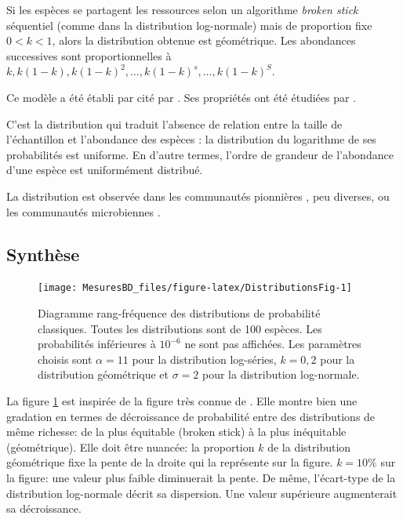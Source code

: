 \documentclass[
  11pt,
  american,
  a4paper,
  extrafontsizes,onecolumn,openright
  ]{memoir}
\begin{document}
Si les espèces se partagent les ressources selon un algorithme \emph{broken stick} séquentiel (comme dans la distribution log-normale) mais de proportion fixe \(0<k<1\), alors la distribution obtenue est géométrique.
Les abondances successives sont proportionnelles à \(k, k(1-k), k(1-k)^2, \dots, k(1-k)^s, \dots, k(1-k)^S\).

Ce modèle a été établi par \textcite{Motomura1932} cité par \textcite{May1975}.
Ses propriétés ont été étudiées par \textcite{Whittaker1972}.

C'est la distribution qui traduit l'absence de relation entre la taille de l'échantillon et l'abondance des espèces \autocite{Pueyo2007}: la distribution du logarithme de ses probabilités est uniforme.
En d'autre termes, l'ordre de grandeur de l'abondance d'une espèce est uniformément distribué.

La distribution est observée dans les communautés pionnières \autocite{Bazzaz1975}, peu diverses, ou les communautés microbiennes \autocite{Haegeman2013}.

\hypertarget{synthuxe8se}{%
\subsection{Synthèse}\label{synthuxe8se}}



\scriptsize

\begin{figure}

{\centering \texttt{[image: MesuresBD\_files/figure-latex/DistributionsFig-1]} 

}

\caption{Diagramme rang-fréquence des distributions de probabilité classiques. Toutes les distributions sont de 100 espèces. Les probabilités inférieures à \(10^{-6}\) ne sont pas affichées. Les paramètres choisis sont \(\alpha=11\) pour la distribution log-séries, \(k=0,2\) pour la distribution géométrique et \(\sigma=2\) pour la distribution log-normale.}\label{fig:DistributionsFig}
\end{figure}

\normalsize

La figure \ref{fig:DistributionsFig} est inspirée de la figure très connue de \textcite{Magurran1988}.
Elle montre bien une gradation en termes de décroissance de probabilité entre des distributions de même richesse: de la plus équitable (broken stick) à la plus inéquitable (géométrique).
Elle doit être nuancée: la proportion \(k\) de la distribution géométrique fixe la pente de la droite qui la représente sur la figure.
\(k=10\%\) sur la figure: une valeur plus faible diminuerait la pente.
De même, l'écart-type de la distribution log-normale décrit sa dispersion.
Une valeur supérieure augmenterait sa décroissance.
\end{document}
